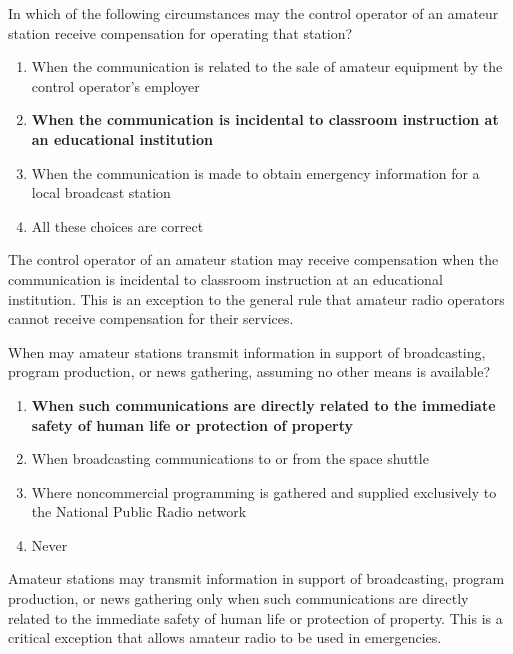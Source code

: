 
\begin{tcolorbox}[colback=gray!10!white,colframe=black!75!black,title={T1D08}]
    In which of the following circumstances may the control operator of an amateur station receive compensation for operating that station?
    \begin{enumerate}[label=\Alph*),noitemsep]
        \item When the communication is related to the sale of amateur equipment by the control operator's employer
        \item \textbf{When the communication is incidental to classroom instruction at an educational institution}
        \item When the communication is made to obtain emergency information for a local broadcast station
        \item All these choices are correct
    \end{enumerate}
\end{tcolorbox}
The control operator of an amateur station may receive compensation when the communication is incidental to classroom instruction at an educational institution. This is an exception to the general rule that amateur radio operators cannot receive compensation for their services.


\begin{tcolorbox}[colback=gray!10!white,colframe=black!75!black,title={T1D09}]
    When may amateur stations transmit information in support of broadcasting, program production, or news gathering, assuming no other means is available?
    \begin{enumerate}[label=\Alph*),noitemsep]
        \item \textbf{When such communications are directly related to the immediate safety of human life or protection of property}
        \item When broadcasting communications to or from the space shuttle
        \item Where noncommercial programming is gathered and supplied exclusively to the National Public Radio network
        \item Never
    \end{enumerate}
\end{tcolorbox}
Amateur stations may transmit information in support of broadcasting, program production, or news gathering only when such communications are directly related to the immediate safety of human life or protection of property. This is a critical exception that allows amateur radio to be used in emergencies.


